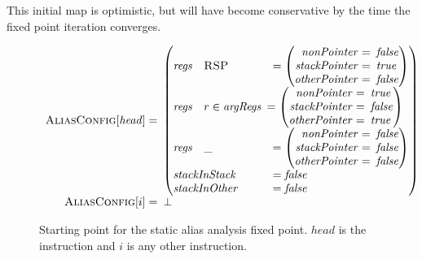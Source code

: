 This initial map is optimistic, but will have become conservative by
the time the fixed point iteration converges.

\begin{figure}
  \begin{displaymath}
    \begin{array}{rl}
      \textsc{AliasConfig}[\mathit{head}] = &\!\!\!\left(\!\!\!\begin{array}{lll}
        \mathit{regs} & \textsc{RSP} & = \left(\begin{array}{rl}
          \mathit{nonPointer} = &\!\!\!\mathit{false}\!\!\!\\
          \!\!\!\mathit{stackPointer} = &\!\!\!\mathit{true}\!\!\!\\
          \!\!\!\mathit{otherPointer} = &\!\!\!\mathit{false}\!\!\!
        \end{array}\right)\\
        \mathit{regs} & r \in \mathit{argRegs} &\!\!\!= \left(\begin{array}{rl}
          \mathit{nonPointer} = &\!\!\!\mathit{true}\!\!\!\\
          \!\!\!\mathit{stackPointer} = &\!\!\!\mathit{false}\!\!\!\\
          \!\!\!\mathit{otherPointer} = &\!\!\!\mathit{true}\!\!\!
        \end{array}\right)\\
        \mathit{regs} & \_ & = \left(\begin{array}{rl}
          \mathit{nonPointer} = &\!\!\!\mathit{false}\!\!\!\\
          \!\!\!\mathit{stackPointer} = &\!\!\!\mathit{false}\!\!\!\\
          \!\!\!\mathit{otherPointer} = &\!\!\!\mathit{false}\!\!\!
        \end{array}\right)\\
        \multicolumn{2}{l}{\mathit{stackInStack}} & = \mathit{false}\\
        \multicolumn{2}{l}{\mathit{stackInOther}} & = \mathit{false}\\
      \end{array}\!\!\!\right)\\
      \textsc{AliasConfig}[i] = &\!\!\!\bot\\
    \end{array}
  \end{displaymath}
  \caption{Starting point for the static alias analysis fixed point.
    $\mathit{head}$ is the  instruction and $i$
    is any other instruction.}
  \label{fig:static_alias:initial_config}
\end{figure}

